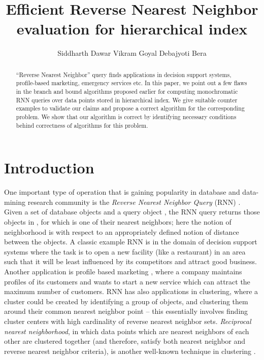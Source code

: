 \documentclass[prodmode,letterpaper]{acmsmall}
\newcommand{\rknn}{RNN\xspace}
\begin{document}

\title{Efficient Reverse  Nearest Neighbor evaluation for hierarchical index}
\author{Siddharth Dawar
Vikram Goyal
Debajyoti Bera
}

\begin{abstract}
``Reverse Nearest Neighbor'' query finds applications in decision support
systems, profile-based marketing, emergency services etc.  In this paper,
we point out a few flaws in the branch and bound algorithms proposed
earlier for computing monochromatic \rknn queries over data points stored
in hierarchical index. We give suitable counter examples to validate our claims and propose a
correct algorithm for the corresponding problem.
We show that our algorithm is correct by identifying necessary
conditions behind correctness of algorithms for this problem.
\end{abstract}






\maketitle


\section{Introduction}\label{section:intro}
One important type of operation that is gaining popularity in database and
data-mining research
community is the {\em Reverse Nearest Neighbor Query} (\rknn)
\cite{korn2000influence}. Given a set of database objects  and a query
object , the \rknn query returns those objects in , for which 
is one of their  nearest neighbors; here the notion of neighborhood is with
respect to an appropriately defined notion of distance between the objects.
A classic example \rknn is in the domain of decision support systems where the task is to open
a new facility (like a restaurant) in an area such that it will be least influenced
by its competitors and attract good business. Another application is profile
based marketing \cite{korn2000influence}, where a company maintains profiles of
its customers and wants to start a new service which can attract the maximum
number of customers.
\rknn has also applications in clustering, where a cluster could be created by
identifying a group of objects, and clustering them around their common nearest
neighbor point -- this essentially involves finding cluster centers
with high cardinality of reverse nearest neighbor sets.
{\em Reciprocal nearest neighborhood}, in which data
points which are nearest neighbors of each other are clustered
together (and therefore, satisfy both nearest neighbor and reverse nearest
neighbor criteria), is another well-known technique in clustering \cite{lopez2012fastrnn}.
\end{document}
